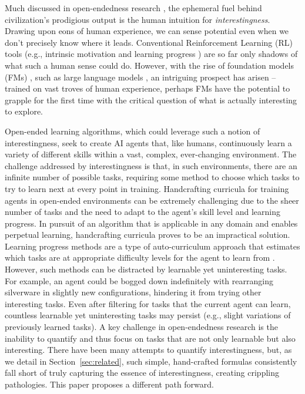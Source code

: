 \documentclass{article} %
\begin{document}
Much discussed in open-endedness research \citep{oreilly2023}, the ephemeral fuel behind civilization's prodigious output is the human intuition for \emph{interestingness}. Drawing upon eons of human experience, we can sense potential even when we don't precisely know where it leads. Conventional Reinforcement Learning (RL) tools (e.g., intrinsic motivation \citep{aubret2019survey, pathak2017curiositydriven, osband2018randomized, colas2022autotelic, oudeyer2007intrinsic} and learning progress \citep{ingmar, matiisen2017, portelas2019teacher, graves2017automated, kovavc2022grimgep, baranes2013active}) are so far only shadows of what such a human sense could do. However, with the rise of foundation models (FMs) \citep{bommasani2021opportunities}, such as large language models \citep{gpt}, an intriguing prospect has arisen -- trained on vast troves of human experience, perhaps FMs have the potential to grapple for the first time with the critical question of what is actually interesting to explore.

Open-ended learning algorithms, which could leverage such a notion of interestingness, seek to create AI agents that, like humans, continuously learn a variety of different skills within a vast, complex, ever-changing environment. The challenge addressed by interestingness is that, in such environments, there are an infinite number of possible tasks, requiring some method to choose which tasks to try to learn next at every point in training. Handcrafting curricula for training agents in open-ended environments can be extremely challenging due to the sheer number of tasks and the need to adapt to the agent's skill level and learning progress. In pursuit of an algorithm that is applicable in any domain and enables perpetual learning, handcrafting curricula proves to be an impractical solution. Learning progress methods are a type of auto-curriculum approach that estimates which tasks are at appropriate difficulty levels for the agent to learn from \citep{ingmar, matiisen2017, portelas2019teacher, graves2017automated, kovavc2022grimgep, baranes2013active}. However, such methods can be distracted by learnable yet uninteresting tasks. For example, an agent could be bogged down indefinitely with rearranging silverware in slightly new configurations, hindering it from trying other interesting tasks. Even after filtering for tasks that the current agent can learn, countless learnable yet uninteresting tasks may persist (e.g., slight variations of previously learned tasks). A key challenge in open-endedness research is the inability to quantify and thus focus on tasks that are not only learnable but also interesting. There have been many attempts to quantify interestingness, but, as we detail in Section~\ref{sec:related}, such simple, hand-crafted formulas consistently fall short of truly capturing the essence of interestingness, creating crippling pathologies. This paper proposes a different path forward.
\end{document}
